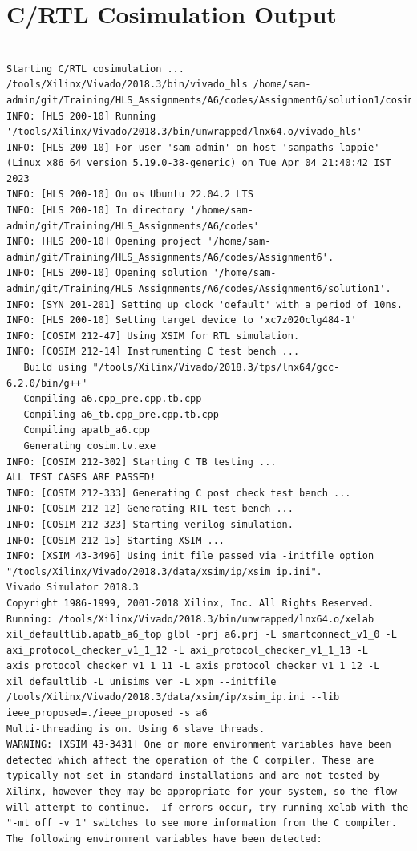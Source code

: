 \documentclass{article}
\begin{document}
\section{C/RTL Cosimulation Output}
\begin{lstlisting}

Starting C/RTL cosimulation ...
/tools/Xilinx/Vivado/2018.3/bin/vivado_hls /home/sam-admin/git/Training/HLS_Assignments/A6/codes/Assignment6/solution1/cosim.tcl
INFO: [HLS 200-10] Running '/tools/Xilinx/Vivado/2018.3/bin/unwrapped/lnx64.o/vivado_hls'
INFO: [HLS 200-10] For user 'sam-admin' on host 'sampaths-lappie' (Linux_x86_64 version 5.19.0-38-generic) on Tue Apr 04 21:40:42 IST 2023
INFO: [HLS 200-10] On os Ubuntu 22.04.2 LTS
INFO: [HLS 200-10] In directory '/home/sam-admin/git/Training/HLS_Assignments/A6/codes'
INFO: [HLS 200-10] Opening project '/home/sam-admin/git/Training/HLS_Assignments/A6/codes/Assignment6'.
INFO: [HLS 200-10] Opening solution '/home/sam-admin/git/Training/HLS_Assignments/A6/codes/Assignment6/solution1'.
INFO: [SYN 201-201] Setting up clock 'default' with a period of 10ns.
INFO: [HLS 200-10] Setting target device to 'xc7z020clg484-1'
INFO: [COSIM 212-47] Using XSIM for RTL simulation.
INFO: [COSIM 212-14] Instrumenting C test bench ...
   Build using "/tools/Xilinx/Vivado/2018.3/tps/lnx64/gcc-6.2.0/bin/g++"
   Compiling a6.cpp_pre.cpp.tb.cpp
   Compiling a6_tb.cpp_pre.cpp.tb.cpp
   Compiling apatb_a6.cpp
   Generating cosim.tv.exe
INFO: [COSIM 212-302] Starting C TB testing ... 
ALL TEST CASES ARE PASSED!
INFO: [COSIM 212-333] Generating C post check test bench ...
INFO: [COSIM 212-12] Generating RTL test bench ...
INFO: [COSIM 212-323] Starting verilog simulation. 
INFO: [COSIM 212-15] Starting XSIM ...
INFO: [XSIM 43-3496] Using init file passed via -initfile option "/tools/Xilinx/Vivado/2018.3/data/xsim/ip/xsim_ip.ini".
Vivado Simulator 2018.3
Copyright 1986-1999, 2001-2018 Xilinx, Inc. All Rights Reserved.
Running: /tools/Xilinx/Vivado/2018.3/bin/unwrapped/lnx64.o/xelab xil_defaultlib.apatb_a6_top glbl -prj a6.prj -L smartconnect_v1_0 -L axi_protocol_checker_v1_1_12 -L axi_protocol_checker_v1_1_13 -L axis_protocol_checker_v1_1_11 -L axis_protocol_checker_v1_1_12 -L xil_defaultlib -L unisims_ver -L xpm --initfile /tools/Xilinx/Vivado/2018.3/data/xsim/ip/xsim_ip.ini --lib ieee_proposed=./ieee_proposed -s a6 
Multi-threading is on. Using 6 slave threads.
WARNING: [XSIM 43-3431] One or more environment variables have been detected which affect the operation of the C compiler. These are typically not set in standard installations and are not tested by Xilinx, however they may be appropriate for your system, so the flow will attempt to continue.  If errors occur, try running xelab with the "-mt off -v 1" switches to see more information from the C compiler. The following environment variables have been detected:

\end{lstlisting}
\end{document}
